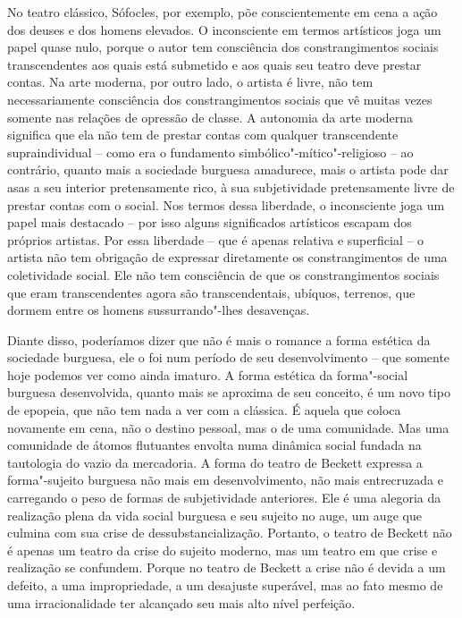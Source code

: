 No teatro clássico, Sófocles, por exemplo, põe conscientemente em cena a
ação dos deuses e dos homens elevados. O inconsciente em termos
artísticos joga um papel quase nulo, porque o autor tem consciência dos
constrangimentos sociais transcendentes aos quais está submetido e aos
quais seu teatro deve prestar contas. Na arte moderna, por outro lado, o
artista é livre, não tem necessariamente consciência dos
constrangimentos sociais que vê muitas vezes somente nas relações de
opressão de classe. A autonomia da arte moderna significa que ela não
tem de prestar contas com qualquer transcendente supraindividual -- como
era o fundamento simbólico"-mítico"-religioso -- ao contrário, quanto mais
a sociedade burguesa amadurece, mais o artista pode dar asas a seu
interior pretensamente rico, à sua subjetividade pretensamente livre de
prestar contas com o social. Nos termos dessa liberdade, o inconsciente
joga um papel mais destacado -- por isso alguns significados artísticos
escapam dos próprios artistas. Por essa liberdade -- que é apenas
relativa e superficial -- o artista não tem obrigação de expressar
diretamente os constrangimentos de uma coletividade social. Ele não tem
consciência de que os constrangimentos sociais que eram transcendentes
agora são transcendentais, ubíquos, terrenos, que dormem entre os homens
sussurrando"-lhes desavenças.

Diante disso, poderíamos dizer que não é mais o romance a forma estética
da sociedade burguesa, ele o foi num período de seu desenvolvimento --
que somente hoje podemos ver como ainda imaturo. A forma estética da
forma"-social burguesa desenvolvida, quanto mais se aproxima de seu
conceito, é um novo tipo de epopeia, que não tem nada a ver com a
clássica. É aquela que coloca novamente em cena, não o destino pessoal,
mas o de uma comunidade. Mas uma comunidade de átomos flutuantes envolta
numa dinâmica social fundada na tautologia do vazio da mercadoria. A
forma do teatro de Beckett expressa a forma"-sujeito burguesa não mais em
desenvolvimento, não mais entrecruzada e carregando o peso de formas de
subjetividade anteriores. Ele é uma alegoria da realização plena da vida
social burguesa e seu sujeito no auge, um auge que culmina com sua crise
de dessubstancialização. Portanto, o teatro de Beckett não é apenas um
teatro da crise do sujeito moderno, mas um teatro em que crise e
realização se confundem. Porque no teatro de Beckett a crise não é
devida a um defeito, a uma impropriedade, a um desajuste superável, mas
ao fato mesmo de uma irracionalidade ter alcançado seu mais alto nível
perfeição.

